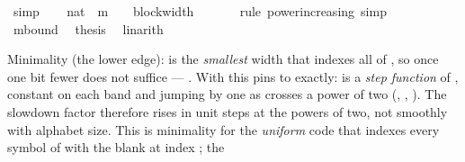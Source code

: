 \begin{isabellebody}
\ simp\isanewline
\ \ \isamarkupfalse%
\ {\isachardoublequoteopen}{\isacharparenleft}{\kern0pt}{}{\isacharcolon}{\kern0pt}{\isacharcolon}{\kern0pt}nat{\isacharparenright}{\kern0pt}\ {\isacharcircum}{\kern0pt}\ {\isacharquery}{\kern0pt}m\ {\isasymle}\ {}\ {\isacharcircum}{\kern0pt}\ block{\isacharunderscore}{\kern0pt}width\ {\isasymGamma}{\isachardoublequoteclose}\isanewline
\ \ \ \ \isamarkupfalse%
\ {\isacharparenleft}{\kern0pt}rule\ power{\isacharunderscore}{\kern0pt}increasing{\isacharparenright}{\kern0pt}\ simp\isanewline
\ \ \isamarkupfalse%
\ m{\isacharunderscore}{\kern0pt}bound\ \isamarkupfalse%
\ {\isacharquery}{\kern0pt}thesis\ \isamarkupfalse%
\ linarith\isanewline
{}\isamarkupfalse%
%
\endisatagproof
{\isafoldproof}%
%
\isadelimproof
%
\endisadelimproof
%
\begin{isamarkuptext}%
Minimality (the lower edge):  is the \emph{smallest} width
  that indexes all of \isa{{\isasymGamma}}, so once  one
  bit fewer does not suffice --- .  With
   this pins  to
   exactly:  is a \emph{step
  function} of , constant on each band
   and jumping by one as
   crosses a power of two (,
  , ).  The slowdown factor therefore
  rises in unit steps at the powers of two, not smoothly with alphabet
  size.  This is minimality for the \emph{uniform} code that indexes
  every symbol of \isa{{\isasymGamma}} with the blank at index ; the

\end{isamarkuptext}
\end{isabellebody}
